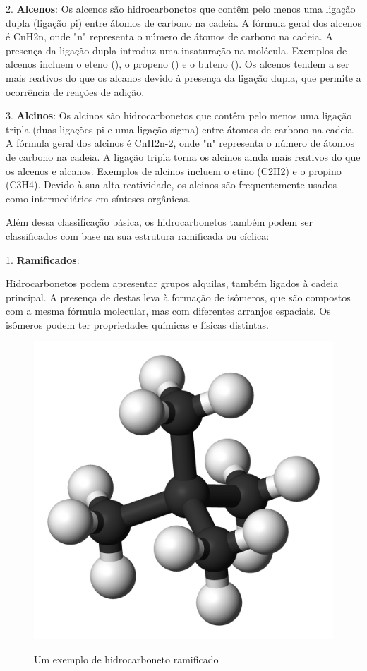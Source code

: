 2. \textbf{Alcenos}:
Os alcenos são hidrocarbonetos que contêm pelo menos uma ligação dupla (ligação pi) entre átomos de carbono na cadeia. A fórmula geral dos alcenos é CnH2n, onde "n" representa o número de átomos de carbono na cadeia. A presença da ligação dupla introduz uma insaturação na molécula. Exemplos de alcenos incluem o eteno (), o propeno () e o buteno (). Os alcenos tendem a ser mais reativos do que os alcanos devido à presença da ligação dupla, que permite a ocorrência de reações de adição.

3. \textbf{Alcinos}:
Os alcinos são hidrocarbonetos que contêm pelo menos uma ligação tripla (duas ligações pi e uma ligação sigma) entre átomos de carbono na cadeia. A fórmula geral dos alcinos é CnH2n-2, onde "n" representa o número de átomos de carbono na cadeia. A ligação tripla torna os alcinos ainda mais reativos do que os alcenos e alcanos. Exemplos de alcinos incluem o etino (C2H2) e o propino (C3H4). Devido à sua alta reatividade, os alcinos são frequentemente usados como intermediários em sínteses orgânicas.

Além dessa classificação básica, os hidrocarbonetos também podem ser classificados com base na sua estrutura ramificada ou cíclica:

1. \textbf{Ramificados}:

Hidrocarbonetos podem apresentar grupos alquilas, também ligados à cadeia principal. A presença de destas leva à formação de isômeros, que são compostos com a mesma fórmula molecular, mas com diferentes arranjos espaciais. Os isômeros podem ter propriedades químicas e físicas distintas.

\begin{figure}[h]\centering
\caption{Um exemplo de hidrocarboneto ramificado}
\includegraphics[scale=0.125]{imagens/Neopentane-3D-balls.png}
\label{fig:ramificado}\vspace{0.5cm}\end{figure}


